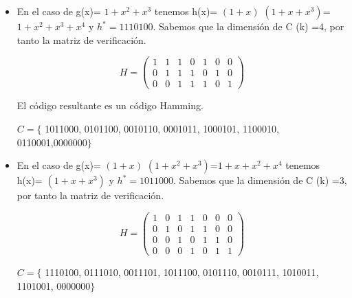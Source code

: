 \documentclass{beamer}
\theoremstyle{plain}
\theoremstyle{example}
\theoremstyle{example}
\begin{document}
\begin{frame}  \small 


\begin{itemize}
\item En el caso de g(x)= $1+x^2+x^3$ tenemos h(x)= $(1+x)$ $(1+x+x^3)$= $1+x^2+x^3+x^4$
y $h^* =1110100$. Sabemos que la dimensión de C (k) =4, por tanto la matriz de verificación.

\[
    H =   \left( \begin{array}{ccccccc}
     				  1 &  1  & 1  & 0 & 1  & 0  & 0\\ 
					  0 &  1  & 1	&  1 & 0 &	 1  & 0\\ 
					  0 &  0  & 1  &  1 & 1 & 0  & 1
           			\end{array}
    		\right) 	    		
\]

El código resultante es un código Hamming.

$C=\{$ 1011000, 0101100, 0010110, 0001011, 1000101, 1100010, 0110001,0000000$\}$\\
\vspace*{5pt}

\end{itemize}

\end{frame} 
\begin{frame}  \small

\begin{itemize}
\item En el caso de g(x)= $(1+x)$ $(1+x^2+x^3)$=$1+x+x^2+x^4$ tenemos h(x)= $(1+x+x^3)$
y $h^* =1011000$. Sabemos que la dimensión de C (k) =3, por tanto la matriz de verificación.

\[
    H =   \left( \begin{array}{ccccccc}
     				  1 &  0  & 1  & 1 & 0  & 0  & 0\\ 
					  0 &  1  & 0	&  1 & 1 &	 0  & 0\\ 
					  0 &  0  & 1  &  0 & 1 & 1  & 0\\
					  0 &  0  & 0  &  1 & 0 & 1  & 1
           			\end{array}
    		\right) 	    		
\]

$C=\{$ 1110100, 0111010, 0011101, 1011100, 0101110, 0010111, 1010011, 1101001, 0000000$\}$
\end{itemize}

\end{frame} 

\end{document}
